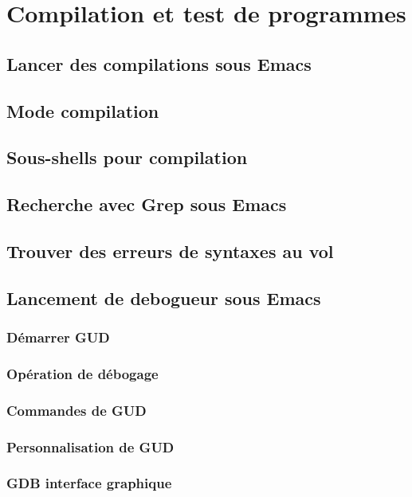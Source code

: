 \chapter{Compilation et test de programmes}\label{chap24}
\section{Lancer des compilations sous Emacs}\label{chap24sec1}
\section{Mode compilation}\label{chap24sec2}
\section{Sous-shells pour compilation}\label{chap24sec3}
\section{Recherche avec Grep sous Emacs}\label{chap24sec4}
\section{Trouver des erreurs de syntaxes au vol}\label{chap24sec4}
\section{Lancement de debogueur sous Emacs}\label{chap24sec5}
\subsection{Démarrer GUD}\label{chap24sec5subsec1}
\subsection{Opération de débogage}\label{chap24sec5subsec2}
\subsection{Commandes de GUD}\label{chap24sec5subsec3}
\subsection{Personnalisation de GUD}\label{chap24sec5subsec4}
\subsection{GDB interface graphique}\label{chap24sec5subsec5}
